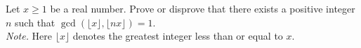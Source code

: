 \documentclass{subfile}
\begin{document}
%
%

	\begin{problem}
		Let $x \geq 1$ be a real number. Prove or disprove that there exists a positive integer $n$ such that $\gcd\left( \lfloor x \rfloor, \lfloor nx \rfloor \right)=1.$\\

		\textit{Note.} Here $\lfloor x \rfloor$ denotes the greatest integer less than or equal to $x.$ %
	\end{problem}

%
\end{document}
